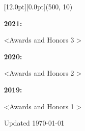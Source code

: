 \documentclass[12pt,a4paper]{report}
\begin{document}
    \begin{center}\begin{minipage}[t]{512pt}
        \colorbox{subtitlecolor}{\raisebox{0pt}[12.0pt][0.0pt]{\makebox(500, 10){
            \textcolor{white}{\ttfamily{}\selectfont{}}}}}\end{minipage}\end{center}    
    \begin{center}
        \begin{minipage}[t]{460pt}
            {\textbf{2021:}} \par
            \quad \textless Awards and Honors 3 \textgreater \par
            \vspace{4pt}\par
            {\textbf{2020:}} \par
            \quad \textless Awards and Honors 2 \textgreater \par
            \vspace{4pt}\par
            {\textbf{2019:}} \par
            \quad \textless Awards and Honors 1 \textgreater \par
        \end{minipage}
     \end{center}
     \begin{center}\vspace{24pt}
        Updated \monthyeardate \today
    \end{center}
\end{document}
